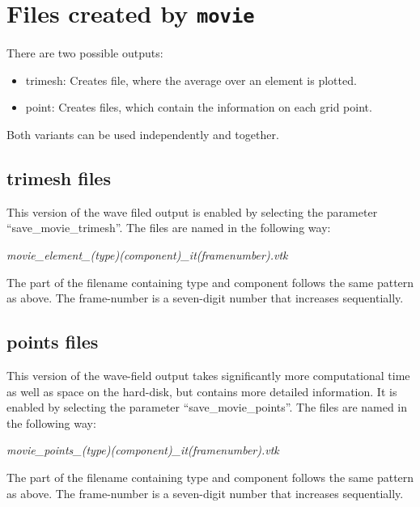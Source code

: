 	\section{Files created by \texttt{movie}}
	\label{sec:movieout}
		There are two possible outputs: 
		\begin{itemize}
			\item trimesh: Creates file, where the average  over an element is plotted.
			\item point: Creates files, which contain the information on each grid point.
		\end{itemize}
		Both variants can be used independently and together.
					
		\subsection{trimesh files}
			This version of the wave filed output is enabled by selecting the parameter ``save\_movie\_trimesh''. The files are named in the following way:
			\begin{center}%
				\emph{movie\_element\_(type)(component)\_it(framenumber).vtk}
			\end{center}
			The part of the filename containing type and component follows the same pattern as above. The frame-number is a seven-digit number that increases sequentially.

			\medskip
		
		\subsection{points files}
			This version of the wave-field output takes significantly more computational time as well as space on the hard-disk, but contains more detailed information. It is enabled by selecting the parameter ``save\_movie\_points''. The files are named in the following way:
			\begin{center}%
				\emph{movie\_points\_(type)(component)\_it(framenumber).vtk}
			\end{center}
			The part of the filename containing type and component follows the same pattern as above. The frame-number is a seven-digit number that increases sequentially.
			
			\medskip
